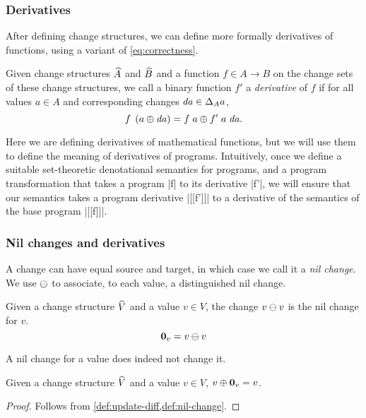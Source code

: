\subsubsection{Derivatives}
After defining change structures, we can define more formally
derivatives of functions, using a variant of
\cref{eq:correctness}.

\begin{definition}[Derivatives]
  \label{def:derivatives}
  Given change structures $\widehat{A}$ and $\widehat{B}$ and a function $f \in A \to
  B$ on the change sets of these change structures, we call a binary function $f'$ a \emph{derivative} of $f$ if
  for all values $a \in A$ and corresponding changes $\D a \in
  \Change[A]{a}$,
  \[\App{f}{\Apply*{\D a}{a}} = \Apply{\App{\App{f'}{a}}{\D a}}{\App{f}{a}}\text{.}\qed\]
\end{definition}

Here we are defining derivatives of mathematical functions, but
we will use them to define the meaning of derivatives of
programs. Intuitively, once we define a suitable set-theoretic
denotational semantics for programs, and a program transformation
that takes a program |f| to its derivative |f'|, we will ensure
that our semantics takes a program derivative |[[f']]| to a
derivative of the semantics of the base program |[[f]]|.

\subsubsection{Nil changes and derivatives}
A change can have equal source and target, in which case we call
it a \emph{nil change}. We use $\DIFF$ to associate, to each
value, a distinguished nil change.
\begin{definition}
  \label{def:nil-change}
  Given a change structure $\widehat{V}$ and a value $v \in V$, the change
  $\Diff{v}{v}$ is the nil change for $v$.
  \[
    \NilC{v} = \Diff{v}{v} \qed
  \]
\end{definition}
A nil change for a value does indeed not change it.
\begin{lemma}
  \label{thm:update-nil}
  Given a change structure $\widehat{V}$ and a value $v \in V$,
  $\Apply{\NilC{v}}{v} = v$.
\end{lemma}

\begin{proof}
Follows from \cref{def:update-diff,def:nil-change}.
\end{proof}

